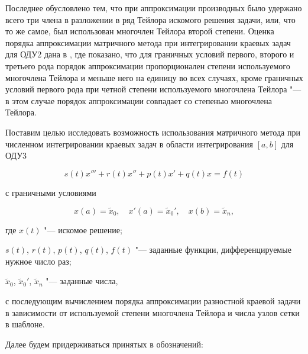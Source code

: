 Последнее обусловлено тем, что при аппроксимации производных было удержано всего три члена в разложении в ряд Тейлора искомого решения задачи, или, что то же самое, был использован многочлен Тейлора второй степени. Оценка порядка аппроксимации матричного метода при интегрировании краевых задач для ОДУ2 дана в \cite{mc:bib2}, где показано, что для граничных условий первого, второго и третьего рода порядок аппроксимации пропорционален степени используемого многочлена Тейлора и меньше него на единицу во всех случаях, кроме граничных условий первого рода при четной степени используемого многочлена Тейлора "--- в этом случае порядок аппроксимации совпадает со степенью многочлена Тейлора.



Поставим целью исследовать возможность использования матричного метода при численном интегрировании краевых задач в области интегрирования $[a,  b]$ для ОДУ3

\begin{equation}

\label{mc:eq1}

s(t)x'''+r(t)x''+p(t)x'+q(t)x=f(t)

\end{equation}

с граничными условиями

\begin{equation}

\label{mc:eq2}

x(a)=\widetilde{x}_0,\quad 

x'(a)=\widetilde{x}_0',\quad 

x(b)=\widetilde{x}_n,

\end{equation}

где $x(t)$  "--- искомое решение; 

$s(t)$, $r(t)$, $p(t)$,  $q(t)$,  $f(t)$  "--- заданные функции, дифференцируемые нужное число раз; 

$\widetilde{x}_0$,  $\widetilde{x}_0'$,  $\widetilde{x}_n$  "--- заданные числа,

с последующим вычислением порядка аппроксимации разностной краевой задачи в зависимости от используемой степени многочлена Тейлора и числа узлов сетки в шаблоне.



Далее будем придерживаться принятых в  \cite{mc:bib6} обозначений:

